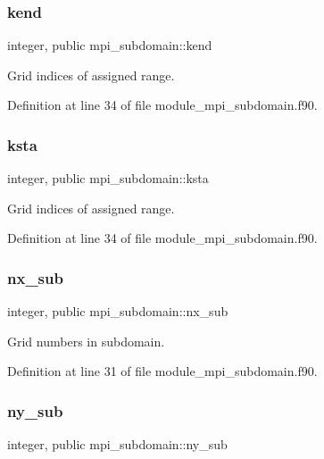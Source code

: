 \subsubsection{\texorpdfstring{kend}{kend}}
{\footnotesize\ttfamily integer, public mpi\+\_\+subdomain\+::kend}



Grid indices of assigned range. 



Definition at line 34 of file module\+\_\+mpi\+\_\+subdomain.\+f90.

\mbox{\label{namespacempi__subdomain_acd499eb1d07159aa9f5c878f9519b00f}} 
\subsubsection{\texorpdfstring{ksta}{ksta}}
{\footnotesize\ttfamily integer, public mpi\+\_\+subdomain\+::ksta}



Grid indices of assigned range. 



Definition at line 34 of file module\+\_\+mpi\+\_\+subdomain.\+f90.

\mbox{\label{namespacempi__subdomain_a005fe127fe0fc85b932814a820a36444}} 
\subsubsection{\texorpdfstring{nx\_sub}{nx\_sub}}
{\footnotesize\ttfamily integer, public mpi\+\_\+subdomain\+::nx\+\_\+sub}



Grid numbers in subdomain. 



Definition at line 31 of file module\+\_\+mpi\+\_\+subdomain.\+f90.

\mbox{\label{namespacempi__subdomain_a665ba05d0ae9309dd28b9b513a0c87a1}} 
\subsubsection{\texorpdfstring{ny\_sub}{ny\_sub}}
{\footnotesize\ttfamily integer, public mpi\+\_\+subdomain\+::ny\+\_\+sub}



